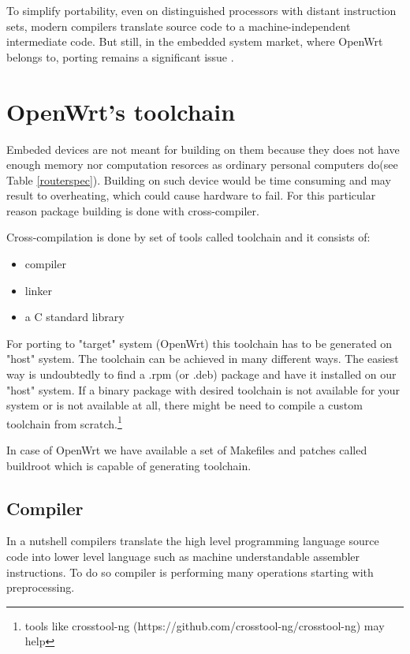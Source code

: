 To simplify portability, even on distinguished processors with distant instruction sets, modern compilers translate source code to a machine-independent intermediate code.
But still, in the embedded system market, where OpenWrt belongs to, porting remains a significant issue \cite{porting_software}.

\section{OpenWrt's toolchain}

Embeded devices are not meant for building on them because they does not have enough memory nor computation resorces as ordinary personal computers do(see Table \ref{routerspec}).
Building on such device would be time consuming and may result to overheating, which could cause hardware to fail.
For this particular reason package building is done with cross-compiler.

Cross-compilation is done by set of tools called toolchain and it consists of:

\begin{itemize}
    \item compiler
    \item linker
    \item a C standard library
\end{itemize}

For porting to "target" system (OpenWrt) this toolchain has to be generated on "host" system.
The toolchain can be achieved in many different ways.
The easiest way is undoubtedly to find a .rpm (or .deb) package and have it installed on our "host" system.
If a binary package with desired toolchain is not available for your system or is not available at all, there might be need to compile a custom toolchain from scratch.\footnote{tools like crosstool-ng (https://github.com/crosstool-ng/crosstool-ng) may help}

In case of OpenWrt we have available a set of Makefiles and patches called buildroot which is capable of generating toolchain.

\subsection{Compiler} 

In a nutshell compilers translate the high level programming language source code into lower level language such as machine understandable assembler instructions.
To do so compiler is performing many operations starting with preprocessing.

